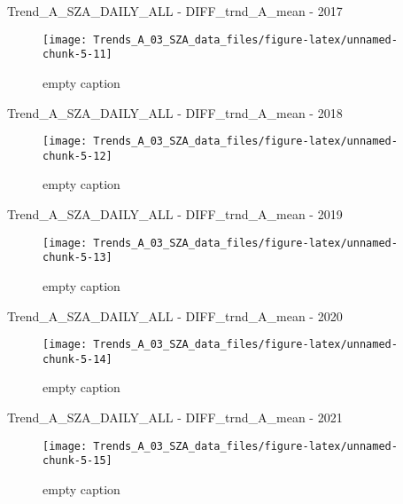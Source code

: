 \documentclass[
  10pt,
  a4paper,oneside]{article}
\begin{document}
Trend\_A\_SZA\_DAILY\_ALL - DIFF\_trnd\_A\_mean - 2017

\begin{figure}[!ht]

{\centering \texttt{[image: Trends\_A\_03\_SZA\_data\_files/figure-latex/unnamed-chunk-5-11]} 

}

\caption{ empty caption }\label{fig:unnamed-chunk-5-11}
\end{figure}

Trend\_A\_SZA\_DAILY\_ALL - DIFF\_trnd\_A\_mean - 2018

\begin{figure}[!ht]

{\centering \texttt{[image: Trends\_A\_03\_SZA\_data\_files/figure-latex/unnamed-chunk-5-12]} 

}

\caption{ empty caption }\label{fig:unnamed-chunk-5-12}
\end{figure}

Trend\_A\_SZA\_DAILY\_ALL - DIFF\_trnd\_A\_mean - 2019

\begin{figure}[!ht]

{\centering \texttt{[image: Trends\_A\_03\_SZA\_data\_files/figure-latex/unnamed-chunk-5-13]} 

}

\caption{ empty caption }\label{fig:unnamed-chunk-5-13}
\end{figure}

Trend\_A\_SZA\_DAILY\_ALL - DIFF\_trnd\_A\_mean - 2020

\begin{figure}[!ht]

{\centering \texttt{[image: Trends\_A\_03\_SZA\_data\_files/figure-latex/unnamed-chunk-5-14]} 

}

\caption{ empty caption }\label{fig:unnamed-chunk-5-14}
\end{figure}

Trend\_A\_SZA\_DAILY\_ALL - DIFF\_trnd\_A\_mean - 2021

\begin{figure}[!ht]

{\centering \texttt{[image: Trends\_A\_03\_SZA\_data\_files/figure-latex/unnamed-chunk-5-15]} 

}

\caption{ empty caption }\label{fig:unnamed-chunk-5-15}
\end{figure}
\end{document}
